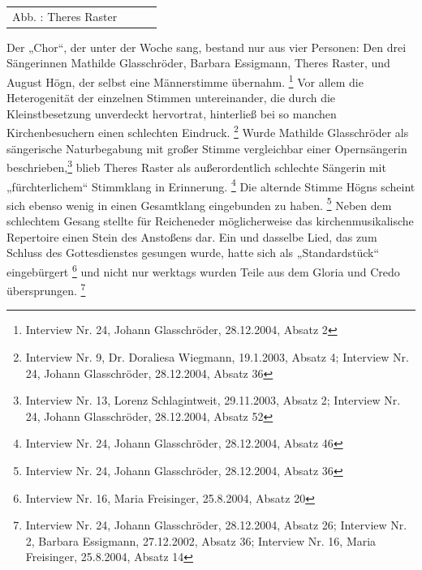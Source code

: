 \begin{flushleft}
\begin{supertabular}{m{3.5939999cm}m{4.361cm}m{4.123cm}m{3.3769999cm}}
Abb. : Theres Raster\\
\end{supertabular}
\end{flushleft}
Der „Chor“, der unter der Woche sang, bestand nur aus vier Personen: Den
drei Sängerinnen Mathilde Glasschröder, Barbara Essigmann, Theres
Raster, und August Högn, der selbst eine Männerstimme
übernahm. \footnote{Interview Nr. 24, Johann Glasschröder, 28.12.2004,
Absatz 2} Vor allem die Heterogenität der einzelnen Stimmen
untereinander, die durch die Kleinstbesetzung unverdeckt hervortrat,
hinterließ bei so manchen Kirchenbesuchern einen schlechten
Eindruck. \footnote{Interview Nr. 9, Dr. Doraliesa Wiegmann, 19.1.2003,
Absatz 4; Interview Nr. 24, Johann Glasschröder, 28.12.2004, Absatz 36}
Wurde Mathilde Glasschröder als sängerische Naturbegabung mit großer
Stimme vergleichbar einer Opernsängerin beschrieben,\footnote{
Interview Nr. 13, Lorenz Schlagintweit, 29.11.2003, Absatz 2; Interview
Nr. 24, Johann Glasschröder, 28.12.2004, Absatz 52} blieb Theres Raster
als außerordentlich schlechte Sängerin mit „fürchterlichem“ Stimmklang
in Erinnerung. \footnote{Interview Nr. 24, Johann Glasschröder,
28.12.2004, Absatz 46} Die alternde Stimme Högns scheint sich ebenso
wenig in einen Gesamtklang eingebunden zu haben. \footnote{Interview
Nr. 24, Johann Glasschröder, 28.12.2004, Absatz 36} Neben dem
schlechtem Gesang stellte für Reicheneder möglicherweise das
kirchenmusikalische Repertoire einen Stein des Anstoßens dar. Ein und
dasselbe Lied, das zum Schluss des Gottesdienstes gesungen wurde, hatte
sich als „Standardstück“ eingebürgert \footnote{Interview Nr. 16, Maria
Freisinger, 25.8.2004, Absatz 20} und nicht nur werktags wurden Teile
aus dem Gloria und Credo übersprungen. \footnote{Interview Nr. 24,
Johann Glasschröder, 28.12.2004, Absatz 26; Interview Nr. 2, Barbara
Essigmann, 27.12.2002, Absatz 36; Interview Nr. 16, Maria Freisinger,
25.8.2004, Absatz 14}

